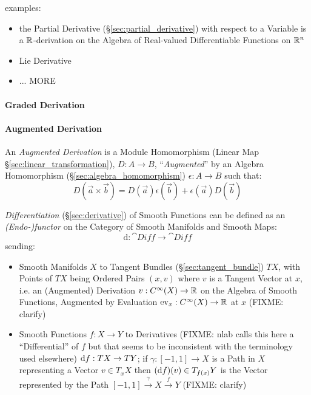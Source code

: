 examples:
\begin{itemize}
  \item the Partial Derivative (\S\ref{sec:partial_derivative}) with respect to
    a Variable is a $\mathbb{R}$-derivation on the Algebra of Real-valued
    Differentiable Functions on $\mathbb{R}^n$
  \item Lie Derivative
  \item ... MORE
\end{itemize}



\paragraph{Graded Derivation}\label{sec:graded_derivation}\hfill

\paragraph{Augmented Derivation}\label{sec:augmented_derivation}\hfill

An \emph{Augmented Derivation} is a Module Homomorphism (Linear Map
\S\ref{sec:linear_transformation}), $D : A \rightarrow B$, ``\emph{Augmented}''
by an Algebra Homomorphism (\S\ref{sec:algebra_homomorphism})
$\epsilon : A \rightarrow B$ such that:
\[
  D(\vec{a} \times \vec{b}) =
  D(\vec{a})\epsilon(\vec{b}) + \epsilon(\vec{a})D(\vec{b})
\]

\fist \emph{Differentiation} (\S\ref{sec:derivative}) of Smooth Functions can be
defined as an \emph{(Endo-)functor} on the Category of Smooth Manifolds and
Smooth Maps:
\[
  \mathrm{d} : \cat{Diff} \rightarrow \cat{Diff}
\]
sending:
\begin{itemize}
  \item Smooth Manifolds $X$ to Tangent Bundles (\S\ref{sec:tangent_bundle}) $T
    X$, with Points of $T X$ being Ordered Pairs $(x, v)$ where $v$ is a Tangent
    Vector at $x$, i.e. an (Augmented) Derivation $v : C^\infty(X) \rightarrow
    \mathbb{R}$ on the Algebra of Smooth Functions, Augmented by Evaluation
    $\mathrm{ev}_x : C^\infty(X) \rightarrow \mathbb{R}$ at $x$ (FIXME: clarify)
  \item Smooth Functions $f : X \rightarrow Y$ to Derivatives (FIXME: nlab calls
    this here a ``Differential'' of $f$ but that seems to be inconsistent with
    the terminology used elsewhere) $\mathrm{d}f : TX \rightarrow TY$; if $\gamma
    : [-1,1] \rightarrow X$ is a Path in $X$ representing a Vector
    $v \in T_x{X}$ then $(\mathrm{d}f)(v) \in T_{f(x)}Y$ is the Vector represented
    by the Path $[-1, 1] \xrightarrow{\gamma} X \xrightarrow{f} Y$
    (FIXME: clarify)
\end{itemize}



